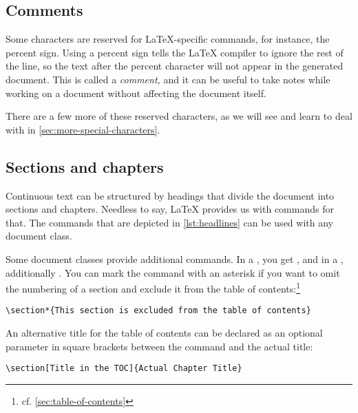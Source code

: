 \subsection{Comments}
Some characters are reserved for \LaTeX-specific commands, for instance, the percent sign. 
Using a percent sign tells the \LaTeX{} compiler to ignore the rest of the line, so the text after the percent character will not appear in the generated  document.
This is called a \emph{comment}\textit{,}
and it can be useful to take notes while working on a document without affecting the document itself. 

There are a few more of these reserved characters, as we will see and learn to deal with in \cref{sec:more-special-characters}.

\subsection{Sections and chapters}
Continuous text can be structured by headings that divide the document into sections and chapters. 
Needless to say, \LaTeX{} provides us with commands for that.
The commands that are depicted in \cref{lst:headlines} can be used with any document class. 


Some document classes provide additional commands. In a , you get , and in a , additionally .
You can mark the command with an asterisk if you want to omit the numbering of a section and exclude it from the table of contents:\footnote{cf. \cref{sec:table-of-contents}}

\begin{verbatim}
\section*{This section is excluded from the table of contents}
\end{verbatim}

An alternative title for the table of contents can be declared as an optional parameter in square brackets between the command and the actual title:

\begin{verbatim}
\section[Title in the TOC]{Actual Chapter Title}
\end{verbatim}


